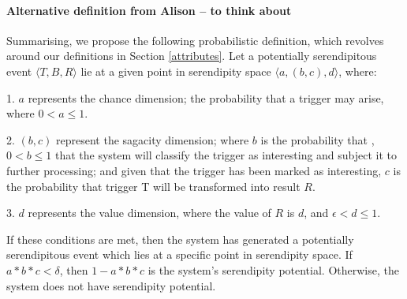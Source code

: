 \begin{mdframed}
\paragraph{Alternative definition from Alison -- to think about}
Summarising, we propose the following probabilistic definition, which
revolves around our definitions in Section \ref{attributes}.  Let a
potentially serendipitous event $\langle T,B,R \rangle$ lie at a given point in
serendipity space $\langle a, (b,c), d \rangle$, where:

1. $a$ represents the chance dimension; the probability that a trigger
may arise, where $0 < a \leq 1$.

2. $(b, c)$ represent the sagacity dimension; where $b$ is the probability
that , $0 < b \leq 1$ that the system will classify the trigger as
interesting and subject it to further processing; and given that the
trigger has been marked as interesting, $c$ is the probability that
trigger T will be transformed into result $R$.

3. $d$ represents the value dimension, where the value of $R$ is $d$, and
$\epsilon < d \leq 1$.

If these conditions are met, then the system has generated a
potentially serendipitous event which lies at a specific point in
serendipity space. If $a * b * c < \delta$, then $1 - a * b * c$ is the
system's serendipity potential. Otherwise, the system does not have
serendipity potential.
\end{mdframed}